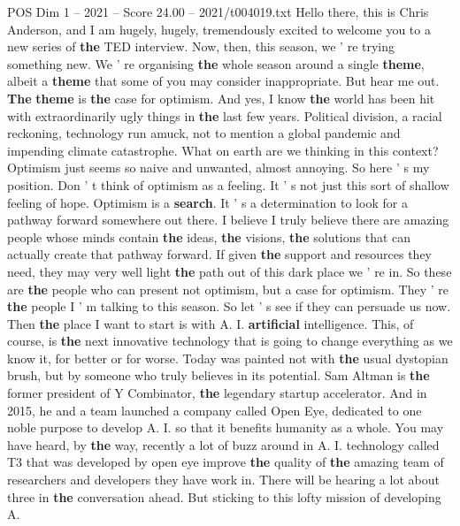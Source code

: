\begin{textsample}{POS Dim 1 – 2021 – Score 24.00 – 2021/t004019.txt}  \label{ex:f1_pos_060}
Hello there, this is Chris Anderson, and I am hugely, hugely, tremendously excited to welcome you to a new series of \textbf{the} TED interview.
Now, then, this season, we ' re trying something new.
We ' re organising \textbf{the} whole season around a single \textbf{theme}, albeit a \textbf{theme} that some of you may consider inappropriate.
But hear me out. \textbf{The} \textbf{theme} is \textbf{the} case for optimism.
And yes, I know \textbf{the} world has been hit with extraordinarily ugly things in \textbf{the} last few years.
Political division, a racial reckoning, technology run amuck, not to mention a global pandemic and impending climate catastrophe.
What on earth are we thinking in this context?
Optimism just seems so naive and unwanted, almost annoying.
So here ' s my position.
Don ' t think of optimism as a feeling.
It ' s not just this sort of shallow feeling of hope.
Optimism is a \textbf{search}.
It ' s a determination to look for a pathway forward somewhere out there.
I believe I truly believe there are amazing people whose minds contain \textbf{the} ideas, \textbf{the} visions, \textbf{the} solutions that can actually create that pathway forward.
If given \textbf{the} support and resources they need, they may very well light \textbf{the} path out of this dark place we ' re in.
So these are \textbf{the} people who can present not optimism, but a case for optimism.
They ' re \textbf{the} people I ' m talking to this season.
So let ' s see if they can persuade us now.
Then \textbf{the} place I want to start is with A.
I. \textbf{artificial} intelligence.
This, of course, is \textbf{the} next innovative technology that is going to change everything as we know it, for better or for worse.
Today was painted not with \textbf{the} usual dystopian brush, but by someone who truly believes in its potential.
Sam Altman is \textbf{the} former president of Y Combinator, \textbf{the} legendary startup accelerator.
And in 2015, he and a team launched a company called Open Eye, dedicated to one noble purpose to develop A.
I. so that it benefits humanity as a whole.
You may have heard, by \textbf{the} way, recently a lot of buzz around in A.
I. technology called T3 that was developed by open eye improve \textbf{the} quality of \textbf{the} amazing team of researchers and developers they have work in.
There will be hearing a lot about three in \textbf{the} conversation ahead.
But sticking to this lofty mission of developing A.

\end{textsample}
